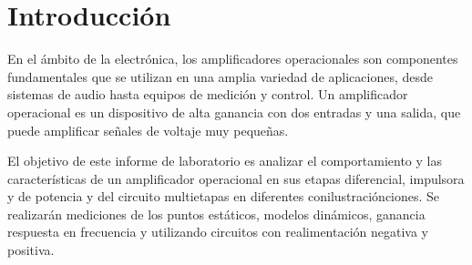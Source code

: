 \section{Introducción}

En el ámbito de la electrónica, los amplificadores operacionales son componentes fundamentales que se utilizan en una amplia variedad de aplicaciones, desde sistemas de audio hasta equipos de medición y control. Un amplificador operacional es un dispositivo de alta ganancia con dos entradas y una salida, que puede amplificar señales de voltaje muy pequeñas.

El objetivo de este informe de laboratorio es analizar el comportamiento y las características de un amplificador operacional en sus etapas diferencial, impulsora y de potencia y del circuito multietapas en diferentes conilustraciónciones. Se realizarán mediciones de los puntos estáticos, modelos dinámicos, ganancia respuesta en frecuencia y utilizando circuitos con realimentación negativa y positiva.  
